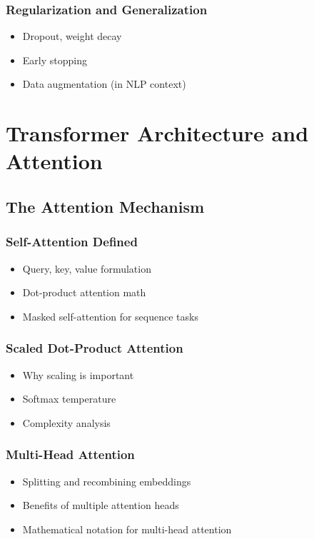 \documentclass[12pt]{book}
\begin{document}
\section{Regularization and Generalization}
\begin{itemize}
    \item Dropout, weight decay
    \item Early stopping
    \item Data augmentation (in NLP context)
\end{itemize}


\part{Transformer Architecture and Attention}

\chapter{The Attention Mechanism}
\section{Self-Attention Defined}
\begin{itemize}
    \item Query, key, value formulation
    \item Dot-product attention math
    \item Masked self-attention for sequence tasks
\end{itemize}

\section{Scaled Dot-Product Attention}
\begin{itemize}
    \item Why scaling is important
    \item Softmax temperature
    \item Complexity analysis
\end{itemize}

\section{Multi-Head Attention}
\begin{itemize}
    \item Splitting and recombining embeddings
    \item Benefits of multiple attention heads
    \item Mathematical notation for multi-head attention
\end{itemize}
\end{document}
